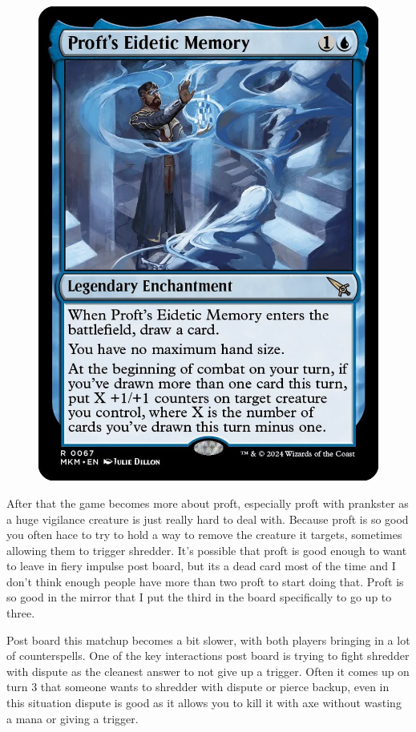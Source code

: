 \documentclass[12pt]{article}
\begin{document}
\begin{figure}
    \includegraphics[width=0.9\linewidth]{Cards/proft.jpg}
\end{figure}

After that the game becomes more about proft, especially proft with prankster as a huge vigilance creature is just really hard to deal with. Because proft is so good you often hace to try to hold a way to remove the creature it targets, sometimes allowing them to trigger shredder. It's possible that proft is good enough to want to leave in fiery impulse post board, but its a dead card most of the time and I don't think enough people have more than two proft to start doing that. Proft is so good in the mirror that I put the third in the board specifically to go up to three.

Post board this matchup becomes a bit slower, with both players bringing in a lot of counterspells. One of the key interactions post board is trying to fight shredder with dispute as the cleanest answer to not give up a trigger. Often it comes up on turn 3 that someone wants to shredder with dispute or pierce backup, even in this situation dispute is good as it allows you to kill it with axe without wasting a mana or giving a trigger.
\end{document}
